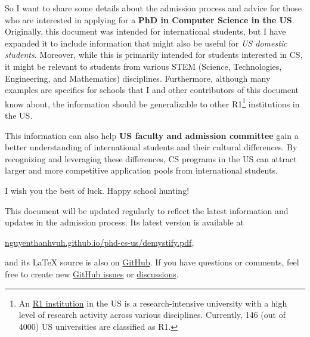 \documentclass[oneside,11pt,dvipsnames]{book}
\begin{document}
So I want to share some details about the admission process and advice for those who are interested in applying for a \textbf{PhD in Computer Science in the US}.
Originally, this document was intended for international students, but I have expanded it to include information that might also be useful for \emph{US domestic students}.
Moreover, while this is primarily intended for students interested in CS, it might be relevant to students from various STEM (Science, Technologies, Engineering, and Mathematics) disciplines.
Furthermore, although many examples are specifics for schools that I and other contributors of this document know about, the information should be generalizable to other R1\footnote{An \href{https://en.wikipedia.org/wiki/List_of_research_universities_in_the_United_States}{R1 institution} in the US is a research-intensive university with a high level of research activity across various disciplines. Currently, 146 (out of 4000) US universities are classified as R1.} institutions in the US.

This information can also help \textbf{US faculty and admission committee} gain a better understanding of international students and their cultural differences.  By recognizing and leveraging these differences, CS programs in the US can attract larger and more competitive application pools from international students.

I wish you the best of luck. Happy school hunting!

\begin{mybox}
This document will be updated regularly to reflect the latest information and updates in the admission process. Its latest version is available at

\begin{center}
  \href{https://nguyenthanhvuh.github.io/phd-cs-us/demystify.pdf}{nguyenthanhvuh.github.io/phd-cs-us/demystify.pdf},
\end{center}

\noindent and its \LaTeX{} source is also on \href{https://github.com/nguyenthanhvuh/phd-cs-us}{GitHub}. If you have questions or comments, feel free to create new \href{https://github.com/nguyenthanhvuh/phd-cs-us/issues}{GitHub issues} or \href{https://github.com/nguyenthanhvuh/phd-cs-us/discussions}{discussions}.

\end{mybox}
\end{document}
